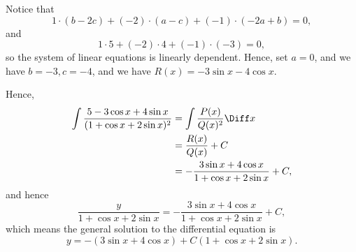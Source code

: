 \begin{enumerate}
          Notice that
          \[
              1 \cdot (b - 2c) + (-2) \cdot (a - c) + (-1) \cdot (-2a + b) = 0,
          \]
          and
          \[
              1 \cdot 5 + (-2) \cdot 4 + (-1) \cdot (-3) = 0,
          \]
          so the system of linear equations is linearly dependent. Hence, set \(a = 0\), and we have \(b = -3, c = -4\), and we have \(R(x)  = -3 \sin x - 4 \cos x\).

          Hence,
          \begin{align*}
              \int \frac{5 - 3 \cos x + 4 \sin x}{(1 + \cos x + 2 \sin x)^2} & = \int \frac{P(x)}{Q(x)^2} \Diff x                         \\
                                                                             & = \frac{R(x)}{Q(x)} + C                                    \\
                                                                             & = - \frac{3 \sin x + 4 \cos x}{1 + \cos x + 2 \sin x} + C,
          \end{align*}
          and hence
          \[
              \frac{y}{1 + \cos x + 2 \sin x} = - \frac{3 \sin x + 4 \cos x}{1 + \cos x + 2 \sin x} + C,
          \]
          which means the general solution to the differential equation is
          \[
              y = - (3 \sin x + 4 \cos x) + C(1 + \cos x + 2 \sin x).
          \]
\end{enumerate}